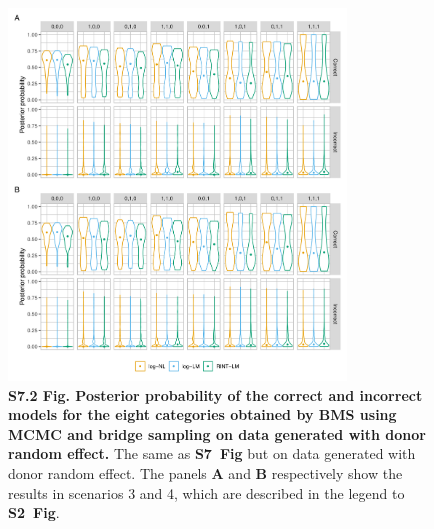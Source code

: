 \documentclass[11pt]{article}
\newcommand{\sfigroccmcmc}{\textbf{S2~Fig}\xspace}
\newcommand{\sfigppmcmcone}{\textbf{S7~Fig}\xspace}
\begin{document}
\begin{figure}[!ht]
\begin{center}
  \includegraphics[width=0.8\textwidth]{png/sim_vln_mcmc_bs2.png}
\end{center}  
\caption{
  {\bf
    S7.2 Fig.
    Posterior probability of the correct and incorrect models for the eight categories obtained by BMS using MCMC and bridge sampling on data generated with donor random effect.}
The same as \sfigppmcmcone but on data generated with donor random effect. The panels \textbf{A} and \textbf{B} respectively show the results in scenarios 3 and 4, which are described in the legend to \sfigroccmcmc.
}
\label{s-fig:sim-vln-mcmc2}
\end{figure}
\end{document}
